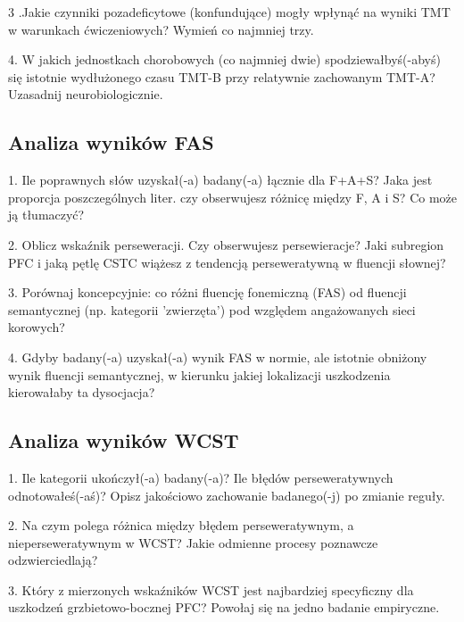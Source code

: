 \documentclass[11pt,a4paper]{article}
\begin{document}
3 .Jakie czynniki pozadeficytowe (konfundujące) mogły wpłynąć na wyniki TMT w warunkach ćwiczeniowych? Wymień co najmniej trzy.
\vspace{0.6em}

4. W jakich jednostkach chorobowych (co najmniej dwie) spodziewałbyś(-abyś) się istotnie wydłużonego czasu TMT-B przy relatywnie zachowanym TMT-A? Uzasadnij neurobiologicznie.
\vspace{0.6em}


\subsection{Analiza wyników FAS}

1. Ile poprawnych słów uzyskał(-a) badany(-a) łącznie dla F+A+S? Jaka jest proporcja poszczególnych liter. czy obserwujesz różnicę między F, A i S? Co może ją tłumaczyć?
\vspace{0.6em}

2. Oblicz wskaźnik perseweracji. Czy obserwujesz persewieracje? Jaki subregion PFC i jaką pętlę CSTC wiążesz z tendencją perseweratywną w fluencji słownej?
\vspace{0.6em}

3. Porównaj koncepcyjnie: co różni fluencję fonemiczną (FAS) od fluencji semantycznej (np. kategorii 'zwierzęta') pod względem angażowanych sieci korowych?
\vspace{0.6em}

4. Gdyby badany(-a) uzyskał(-a) wynik FAS w normie, ale istotnie obniżony wynik fluencji semantycznej, w kierunku jakiej lokalizacji uszkodzenia kierowałaby ta dysocjacja?
\vspace{0.6em}

\subsection{Analiza wyników WCST}

1. Ile kategorii ukończył(-a) badany(-a)? Ile błędów perseweratywnych odnotowałeś(-aś)? Opisz jakościowo zachowanie badanego(-j) po zmianie reguły.
\vspace{0.6em}

2. Na czym polega różnica między błędem perseweratywnym, a nieperseweratywnym w WCST? Jakie odmienne procesy poznawcze odzwierciedlają?
\vspace{0.6em}

3. Który z mierzonych wskaźników WCST jest najbardziej specyficzny dla uszkodzeń grzbietowo-bocznej PFC? Powołaj się na jedno badanie empiryczne.
\vspace{0.6em}
\end{document}
